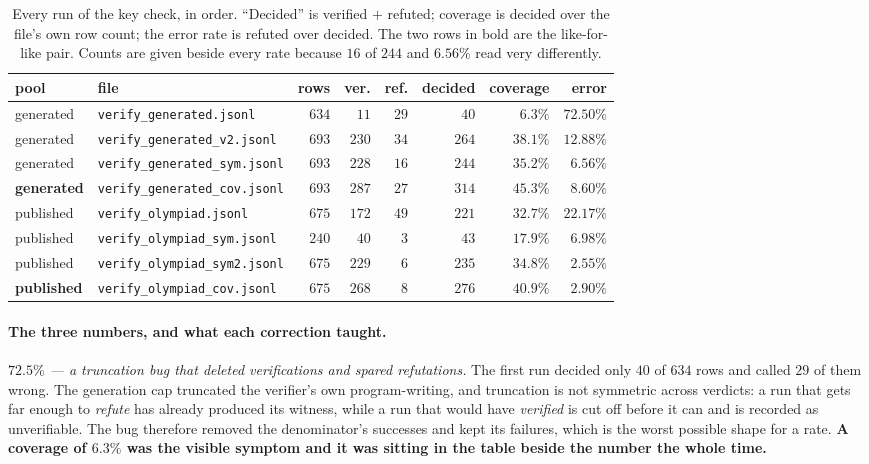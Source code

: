 \begin{table}[t]
\centering\small
\caption{Every run of the key check, in order. ``Decided'' is verified $+$ refuted; coverage is
decided over the file's own row count; the error rate is refuted over decided. The two rows in
bold are the like-for-like pair. Counts are given beside every rate because $16$ of $244$ and
$6.56\%$ read very differently.}
\label{tab:keyquality}
\begin{tabular}{llrrrrrr}
\toprule
pool & file & rows & ver. & ref. & decided & coverage & error \\
\midrule
generated & \texttt{verify\_generated.jsonl}      & $634$ & $11$  & $29$ & $40$  & $6.3\%$  & $72.50\%$ \\
generated & \texttt{verify\_generated\_v2.jsonl}  & $693$ & $230$ & $34$ & $264$ & $38.1\%$ & $12.88\%$ \\
generated & \texttt{verify\_generated\_sym.jsonl} & $693$ & $228$ & $16$ & $244$ & $35.2\%$ & $6.56\%$ \\
\textbf{generated} & \texttt{verify\_generated\_cov.jsonl} & $693$ & $287$ & $27$ & $314$ & $\mathbf{45.3\%}$ & $\mathbf{8.60\%}$ \\
\midrule
published & \texttt{verify\_olympiad.jsonl}        & $675$ & $172$ & $49$ & $221$ & $32.7\%$ & $22.17\%$ \\
published & \texttt{verify\_olympiad\_sym.jsonl}   & $240$ & $40$  & $3$  & $43$  & $17.9\%$ & $6.98\%$ \\
published & \texttt{verify\_olympiad\_sym2.jsonl}  & $675$ & $229$ & $6$  & $235$ & $34.8\%$ & $2.55\%$ \\
\textbf{published} & \texttt{verify\_olympiad\_cov.jsonl} & $675$ & $268$ & $8$ & $276$ & $\mathbf{40.9\%}$ & $\mathbf{2.90\%}$ \\
\bottomrule
\end{tabular}
\end{table}

\paragraph{The three numbers, and what each correction taught.}

\emph{$72.5\%$ --- a truncation bug that deleted verifications and spared refutations.} The
first run decided only $40$ of $634$ rows and called $29$ of them wrong. The generation cap
truncated the verifier's own program-writing, and truncation is not symmetric across verdicts:
a run that gets far enough to \emph{refute} has already produced its witness, while a run that
would have \emph{verified} is cut off before it can and is recorded as unverifiable. The bug
therefore removed the denominator's successes and kept its failures, which is the worst
possible shape for a rate. \textbf{A coverage of $6.3\%$ was the visible symptom and it was
sitting in the table beside the number the whole time.}

